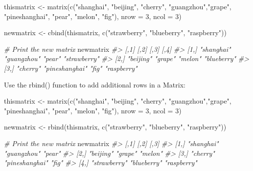 \documentclass[
]{book}
\newenvironment{Shaded}{\begin{snugshade}}{\end{snugshade}}
\newcommand{\AttributeTok}[1]{\textcolor[rgb]{0.77,0.63,0.00}{#1}}
\newcommand{\CommentTok}[1]{\textcolor[rgb]{0.56,0.35,0.01}{\textit{#1}}}
\newcommand{\DecValTok}[1]{\textcolor[rgb]{0.00,0.00,0.81}{#1}}
\newcommand{\FunctionTok}[1]{\textcolor[rgb]{0.00,0.00,0.00}{#1}}
\newcommand{\NormalTok}[1]{#1}
\newcommand{\OtherTok}[1]{\textcolor[rgb]{0.56,0.35,0.01}{#1}}
\newcommand{\StringTok}[1]{\textcolor[rgb]{0.31,0.60,0.02}{#1}}
\begin{document}
\begin{Shaded}
\begin{Highlighting}[]
\NormalTok{thismatrix }\OtherTok{\textless{}{-}} \FunctionTok{matrix}\NormalTok{(}\FunctionTok{c}\NormalTok{(}\StringTok{"shanghai"}\NormalTok{, }\StringTok{"beijing"}\NormalTok{, }\StringTok{"cherry"}\NormalTok{, }\StringTok{"guangzhou"}\NormalTok{,}\StringTok{"grape"}\NormalTok{, }\StringTok{"pineshanghai"}\NormalTok{, }\StringTok{"pear"}\NormalTok{, }\StringTok{"melon"}\NormalTok{, }\StringTok{"fig"}\NormalTok{), }\AttributeTok{nrow =} \DecValTok{3}\NormalTok{, }\AttributeTok{ncol =} \DecValTok{3}\NormalTok{)}

\NormalTok{newmatrix }\OtherTok{\textless{}{-}} \FunctionTok{cbind}\NormalTok{(thismatrix, }\FunctionTok{c}\NormalTok{(}\StringTok{"strawberry"}\NormalTok{, }\StringTok{"blueberry"}\NormalTok{, }\StringTok{"raspberry"}\NormalTok{))}

\CommentTok{\# Print the new matrix}
\NormalTok{newmatrix}
\CommentTok{\#\textgreater{}      [,1]       [,2]           [,3]    [,4]        }
\CommentTok{\#\textgreater{} [1,] "shanghai" "guangzhou"    "pear"  "strawberry"}
\CommentTok{\#\textgreater{} [2,] "beijing"  "grape"        "melon" "blueberry" }
\CommentTok{\#\textgreater{} [3,] "cherry"   "pineshanghai" "fig"   "raspberry"}
\end{Highlighting}
\end{Shaded}

Use the rbind() function to add additional rows in a Matrix:

\begin{Shaded}
\begin{Highlighting}[]
\NormalTok{thismatrix }\OtherTok{\textless{}{-}} \FunctionTok{matrix}\NormalTok{(}\FunctionTok{c}\NormalTok{(}\StringTok{"shanghai"}\NormalTok{, }\StringTok{"beijing"}\NormalTok{, }\StringTok{"cherry"}\NormalTok{, }\StringTok{"guangzhou"}\NormalTok{,}\StringTok{"grape"}\NormalTok{, }\StringTok{"pineshanghai"}\NormalTok{, }\StringTok{"pear"}\NormalTok{, }\StringTok{"melon"}\NormalTok{, }\StringTok{"fig"}\NormalTok{), }\AttributeTok{nrow =} \DecValTok{3}\NormalTok{, }\AttributeTok{ncol =} \DecValTok{3}\NormalTok{)}

\NormalTok{newmatrix }\OtherTok{\textless{}{-}} \FunctionTok{rbind}\NormalTok{(thismatrix, }\FunctionTok{c}\NormalTok{(}\StringTok{"strawberry"}\NormalTok{, }\StringTok{"blueberry"}\NormalTok{, }\StringTok{"raspberry"}\NormalTok{))}

\CommentTok{\# Print the new matrix}
\NormalTok{newmatrix}
\CommentTok{\#\textgreater{}      [,1]         [,2]           [,3]       }
\CommentTok{\#\textgreater{} [1,] "shanghai"   "guangzhou"    "pear"     }
\CommentTok{\#\textgreater{} [2,] "beijing"    "grape"        "melon"    }
\CommentTok{\#\textgreater{} [3,] "cherry"     "pineshanghai" "fig"      }
\CommentTok{\#\textgreater{} [4,] "strawberry" "blueberry"    "raspberry"}
\end{Highlighting}
\end{Shaded}
\end{document}
